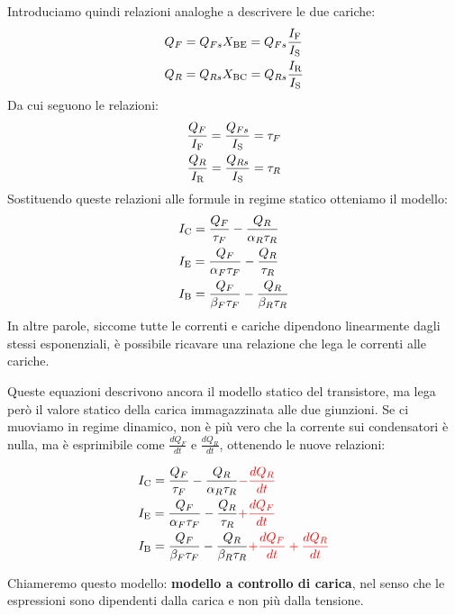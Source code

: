 \documentclass[../template]{subfiles}
\def\xbe{\ensuremath{X_\text{BE}}}
\def\xbc{\ensuremath{X_\text{BC}}}
\begin{document}
Introduciamo quindi relazioni analoghe a descrivere le due cariche:
\begin{align*}
    &Q_F = Q_{Fs} \xbe = Q_{Fs} \frac{\I{F}}{\I{S}}\\
    &Q_R = Q_{Rs} \xbc= Q_{Rs} \frac{\I{R}}{\I{S}}
\end{align*}
Da cui seguono le relazioni:
\begin{align*}
    \frac{Q_{F}}{I_{\text{F}}} = \frac{Q_{Fs}}{I_{\text{S}}} = \tau_F\\
    \frac{Q_{R}}{I_{\text{R}}} = \frac{Q_{Rs}}{I_{\text{S}}} = \tau_R
\end{align*}
Sostituendo queste relazioni alle formule in regime statico otteniamo il modello:
\begin{align*}
    &I_{\text{C}} = \frac{Q_F}{\tau_F} - \frac{Q_R}{\alpha_R \tau_R}\\
    &I_{\text{E}} = \frac{Q_F}{\alpha_F \tau_F} - \frac{Q_R}{\tau_R}\\
    &I_{\text{B}} = \frac{Q_F}{\beta_F \tau_F} - \frac{Q_R}{\beta_R \tau_R}
\end{align*}
In altre parole, siccome tutte le correnti e cariche dipendono linearmente dagli stessi esponenziali, è possibile ricavare una relazione che lega le correnti alle cariche.

Queste equazioni descrivono ancora il modello statico del transistore, ma lega però il valore statico della carica immagazzinata alle due giunzioni. Se ci muoviamo in regime dinamico, non è più vero che la corrente sui condensatori è nulla, ma è esprimibile come $\frac{dQ_F}{dt}$ e $\frac{dQ_R}{dt}$, ottenendo le nuove relazioni:

\begin{align*}
    &I_{\text{C}} = \frac{Q_F}{\tau_F} - \frac{Q_R}{\alpha_R \tau_R} {\color{red} - \frac{dQ_R}{dt}}\\
    &I_{\text{E}} = \frac{Q_F}{\alpha_F \tau_F} - \frac{Q_R}{\tau_R} {\color{red} + \frac{dQ_F}{dt}}\\
    &I_{\text{B}} = \frac{Q_F}{\beta_F \tau_F} - \frac{Q_R}{\beta_R \tau_R} {\color{red} + \frac{dQ_F}{dt} + \frac{dQ_R}{dt} }
\end{align*}

Chiameremo questo modello: \textbf{modello a controllo di carica}, nel senso che le espressioni sono dipendenti dalla carica e non più dalla tensione.
\end{document}

